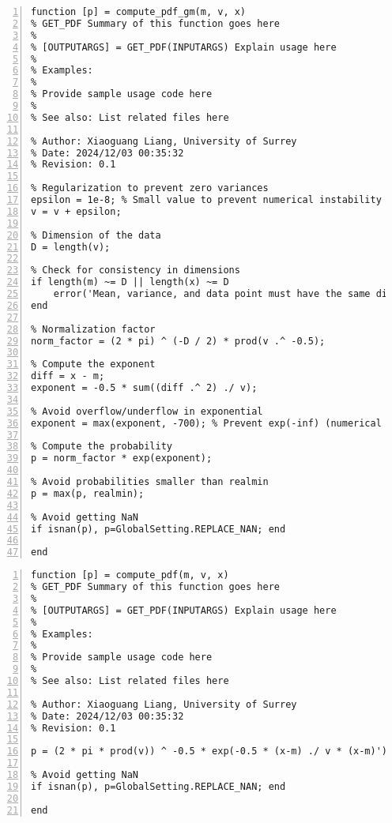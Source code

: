 \documentclass{article}
\begin{document}
\begin{lstlisting}[frame=single, numbers=left, style=Matlab-editor, caption={compute\_pdf\_gm.m}, label={lst:compute_pdf_gm}]
  function [p] = compute_pdf_gm(m, v, x)
% GET_PDF Summary of this function goes here
%
% [OUTPUTARGS] = GET_PDF(INPUTARGS) Explain usage here
%
% Examples:
%
% Provide sample usage code here
%
% See also: List related files here

% Author: Xiaoguang Liang, University of Surrey
% Date: 2024/12/03 00:35:32
% Revision: 0.1

% Regularization to prevent zero variances
epsilon = 1e-8; % Small value to prevent numerical instability
v = v + epsilon;

% Dimension of the data
D = length(v);

% Check for consistency in dimensions
if length(m) ~= D || length(x) ~= D
    error('Mean, variance, and data point must have the same dimension.');
end

% Normalization factor
norm_factor = (2 * pi) ^ (-D / 2) * prod(v .^ -0.5);

% Compute the exponent
diff = x - m;
exponent = -0.5 * sum((diff .^ 2) ./ v);

% Avoid overflow/underflow in exponential
exponent = max(exponent, -700); % Prevent exp(-inf) (numerical limit of exp in MATLAB)

% Compute the probability
p = norm_factor * exp(exponent);

% Avoid probabilities smaller than realmin
p = max(p, realmin);

% Avoid getting NaN
if isnan(p), p=GlobalSetting.REPLACE_NAN; end

end

\end{lstlisting}

\begin{lstlisting}[frame=single, numbers=left, style=Matlab-editor, caption={compute\_pdf.m}, label={lst:compute_pdf}]
  function [p] = compute_pdf(m, v, x)
% GET_PDF Summary of this function goes here
%
% [OUTPUTARGS] = GET_PDF(INPUTARGS) Explain usage here
%
% Examples:
%
% Provide sample usage code here
%
% See also: List related files here

% Author: Xiaoguang Liang, University of Surrey
% Date: 2024/12/03 00:35:32
% Revision: 0.1

p = (2 * pi * prod(v)) ^ -0.5 * exp(-0.5 * (x-m) ./ v * (x-m)');

% Avoid getting NaN
if isnan(p), p=GlobalSetting.REPLACE_NAN; end

end

\end{lstlisting}
\end{document}
